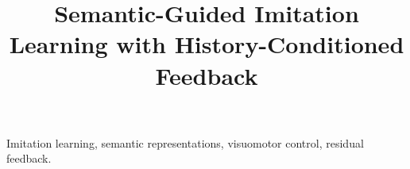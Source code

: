 \documentclass[journal,10pt]{IEEEtran}
\title{Semantic-Guided Imitation Learning with History-Conditioned Feedback}
\author{}
\newcommand{\draftnote}[1]{\par\smallskip{\small（\CJKunderline{#1}）}\par\smallskip}
\begin{document}
\maketitle
\begin{abstract}
\end{abstract}
\begin{IEEEkeywords}
Imitation learning, semantic representations, visuomotor control, residual feedback.
\end{IEEEkeywords}






\appendices






\end{document}
